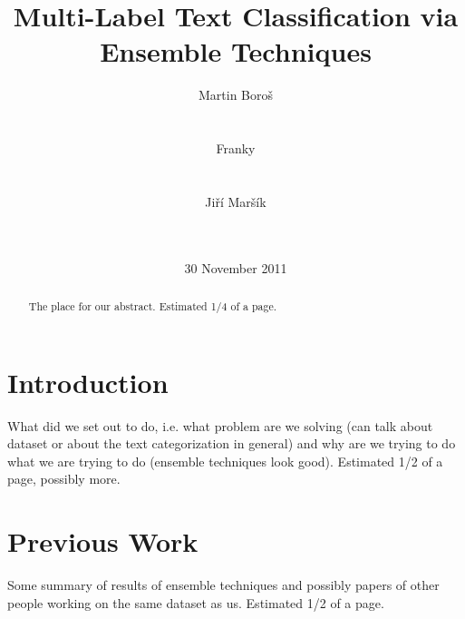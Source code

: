 \documentclass{acm_proc_article-sp}
\begin{document}
\title{Multi-Label Text Classification via Ensemble Techniques}

\author{
\alignauthor
Martin Boro\v{s}\\
       \\
       \\
\alignauthor
Franky\\
       \\
       \\
\alignauthor
Ji\v{r}\'{i} Mar\v{s}\'{i}k\\
       \\
       \\
       }

\date{30 November 2011}

\maketitle
\begin{abstract}
The place for our abstract. Estimated 1/4 of a page.
\end{abstract}




\section{Introduction}
What did we set out to do, i.e. what problem are we solving (can talk about
dataset or about the text categorization in general) and why are we trying to do
what we are trying to do (ensemble techniques look good). Estimated 1/2 of a
page, possibly more.

\section{Previous Work}
Some summary of results of ensemble techniques and possibly papers of other
people working on the same dataset as us. Estimated 1/2 of a page.







\balancecolumns
\end{document}
